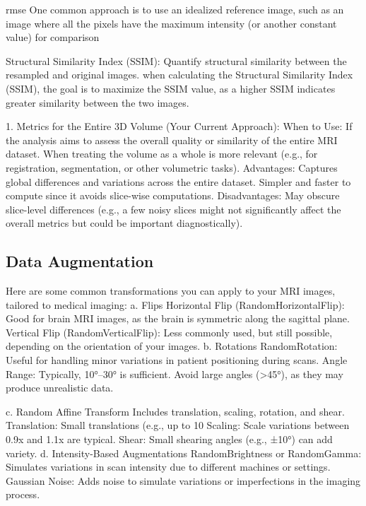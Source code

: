 rmse
One common approach is to use an idealized reference image, such as an image where all the pixels have the maximum intensity (or another constant value) for comparison

Structural Similarity Index (SSIM): Quantify structural similarity between the resampled and original images.
when calculating the Structural Similarity Index (SSIM), the goal is to maximize the SSIM value, as a higher SSIM indicates greater similarity between the two images.


1. Metrics for the Entire 3D Volume (Your Current Approach):
When to Use:
If the analysis aims to assess the overall quality or similarity of the entire MRI dataset.
When treating the volume as a whole is more relevant (e.g., for registration, segmentation, or other volumetric tasks).
Advantages:
Captures global differences and variations across the entire dataset.
Simpler and faster to compute since it avoids slice-wise computations.
Disadvantages:
May obscure slice-level differences (e.g., a few noisy slices might not significantly affect the overall metrics but could be important diagnostically).

%
\subsection{Data Augmentation}
Here are some common transformations you can apply to your MRI images, tailored to medical imaging:
a. Flips
Horizontal Flip (RandomHorizontalFlip): Good for brain MRI images, as the brain is symmetric along the sagittal plane.
Vertical Flip (RandomVerticalFlip): Less commonly used, but still possible, depending on the orientation of your images.
b. Rotations
RandomRotation: Useful for handling minor variations in patient positioning during scans.
Angle Range: Typically, 10°–30° is sufficient. Avoid large angles (>45°), as they may produce unrealistic data.

c. Random Affine Transform
Includes translation, scaling, rotation, and shear.
Translation: Small translations (e.g., up to 10%
Scaling: Scale variations between 0.9x and 1.1x are typical.
Shear: Small shearing angles (e.g., ±10°) can add variety.
d. Intensity-Based Augmentations
RandomBrightness or RandomGamma: Simulates variations in scan intensity due to different machines or settings.
Gaussian Noise: Adds noise to simulate variations or imperfections in the imaging process.

